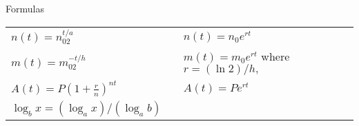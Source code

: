 \documentclass[12pt]{article}
\begin{document}
\hrulefill

\begin{center} Formulas \\ 
\begin{tabular}{lll}
$n(t)=n_02^{t/a}$&\hspace{-.2in}&$n(t)=n_0e^{rt}$\\
$m(t)=m_02^{-t/h}$&\hspace{-.2in}&$m(t)=m_0e^{rt}$ where $r=(\ln 2)/h,$\\

$A(t)=P(1+\frac{r}{n})^{nt}$&\hspace{-.2in}&$A(t)=Pe^{rt}$\\
$\log_b x = (\log_a x )/(\log_a b)$&&\\
\end{tabular}
\end{center}

\newpage
\end{document}
